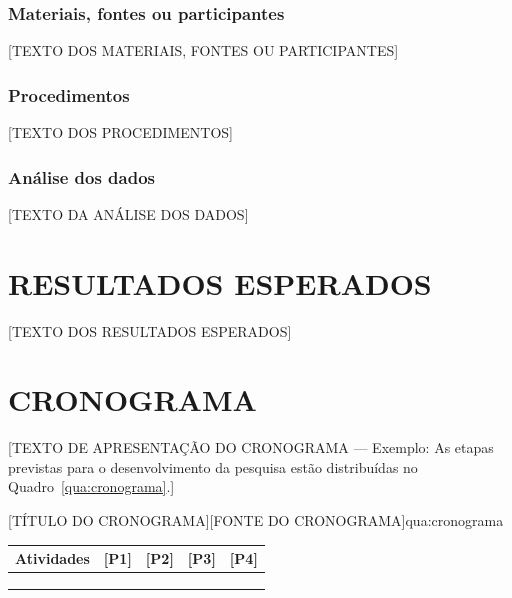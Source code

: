 \documentclass[12pt,a4paper,oneside]{article}
\newcommand{\Secao}[1]{%
  \ifSecoesEmNovaPagina\clearpage\fi
  \section{#1}%
}
\newcommand{\Subsubsecao}[1]{\subsubsection{#1}}
\begin{document}
\Subsubsecao{Materiais, fontes ou participantes}
[TEXTO DOS MATERIAIS, FONTES OU PARTICIPANTES]

\Subsubsecao{Procedimentos}
[TEXTO DOS PROCEDIMENTOS]

\Subsubsecao{Análise dos dados}
[TEXTO DA ANÁLISE DOS DADOS]



\Secao{RESULTADOS ESPERADOS}
[TEXTO DOS RESULTADOS ESPERADOS]



\ifMostrarCronograma
\Secao{CRONOGRAMA}
[TEXTO DE APRESENTAÇÃO DO CRONOGRAMA — Exemplo: As etapas previstas para o desenvolvimento da pesquisa estão distribuídas no Quadro~\ref{qua:cronograma}.]

\begin{Quadro}{[TÍTULO DO CRONOGRAMA]}{[FONTE DO CRONOGRAMA]}{qua:cronograma}
  \begin{tabularx}{\linewidth}{|L|*{4}{M{1.4cm}|}}
    \hline
    \textbf{Atividades} & \textbf{[P1]} & \textbf{[P2]} & \textbf{[P3]} & \textbf{[P4]} \\ \hline
    [ATIVIDADE 1] & & & & \\ \hline
    [ATIVIDADE 2] & & & & \\ \hline
    [ATIVIDADE 3] & & & & \\ \hline
  \end{tabularx}
\end{Quadro}
\fi
\end{document}
